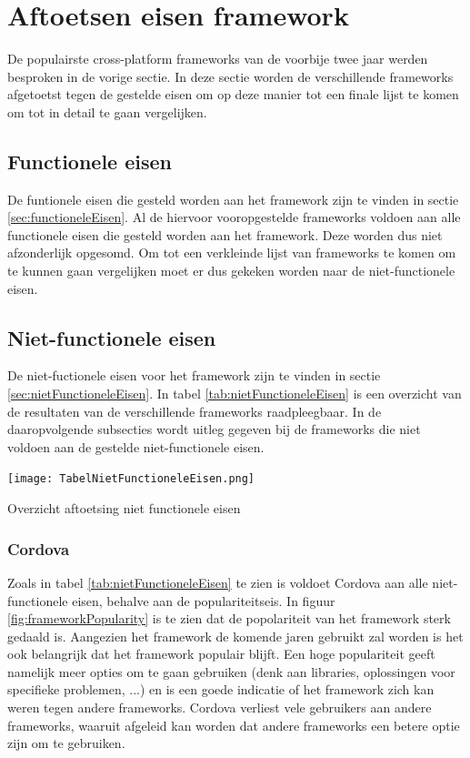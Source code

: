 \section{Aftoetsen eisen framework}
\label{sec:aftoetsenEisen}

De populairste cross-platform frameworks van de voorbije twee jaar werden besproken in de vorige sectie. In deze sectie worden de verschillende frameworks afgetoetst tegen de gestelde eisen om op deze manier tot een finale lijst te komen om tot in detail te gaan vergelijken.

\subsection{Functionele eisen}
\label{subsec:aftoetstenFunctioneleEisen}

De funtionele eisen die gesteld worden aan het framework zijn te vinden in sectie \ref{sec:functioneleEisen}. Al de hiervoor vooropgestelde frameworks voldoen aan alle functionele eisen die gesteld worden aan het framework. Deze worden dus niet afzonderlijk opgesomd. Om tot een verkleinde lijst van frameworks te komen om te kunnen gaan vergelijken moet er dus gekeken worden naar de niet-functionele eisen.

\subsection{Niet-functionele eisen}
\label{subsec:aftoetsenNietFunctioneleEisen}

De niet-fuctionele eisen voor het framework zijn te vinden in sectie \ref{sec:nietFunctioneleEisen}. In tabel \ref{tab:nietFunctioneleEisen} is een overzicht van de resultaten van de verschillende frameworks raadpleegbaar. In de daaropvolgende subsecties wordt uitleg gegeven bij de frameworks die niet voldoen aan de gestelde niet-functionele eisen.

\begin{table}
    \texttt{[image: TabelNietFunctioneleEisen.png]}
    \caption{Overzicht aftoetsing niet functionele eisen}
    \label{tab:nietFunctioneleEisen}
\end{table}

\subsubsection{Cordova}
\label{subsubsec:CordovaEisen}

Zoals in tabel \ref{tab:nietFunctioneleEisen} te zien is voldoet Cordova aan alle niet-functionele eisen, behalve aan de populariteitseis. In figuur \ref{fig:frameworkPopularity} is te zien dat de popolariteit van het framework sterk gedaald is. Aangezien het framework  de komende jaren gebruikt zal worden is het ook belangrijk dat het framework populair blijft. Een hoge populariteit geeft namelijk meer opties om te gaan gebruiken (denk aan libraries, oplossingen voor specifieke problemen, ...) en is een goede indicatie of het framework zich kan weren tegen andere frameworks. Cordova verliest vele gebruikers aan andere frameworks, waaruit afgeleid kan worden dat andere frameworks een betere optie zijn om te gebruiken.

